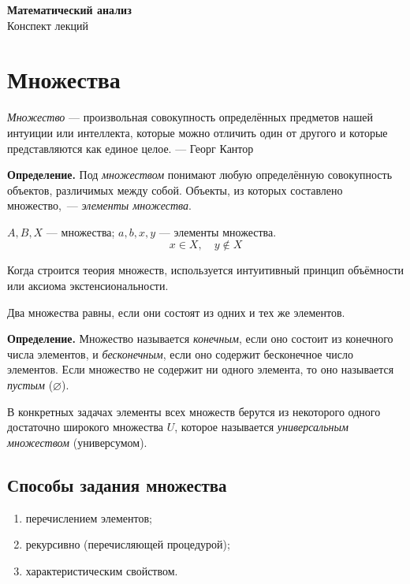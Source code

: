\documentclass[a4paper,11pt]{article}
\begin{document}
\begin{center}
{\LARGE\bfseries\color{secred}Математический анализ}\\[3pt]
{\large Конспект лекций}
\end{center}
\vspace{-2mm}

\tableofcontents
\newpage

\section{Множества}

\emph{Множество} --- произвольная совокупность определённых предметов нашей
интуиции или интеллекта, которые можно отличить один от другого и которые
представляются как единое целое.
\hfill --- Георг Кантор

\begin{opr}
\textbf{Определение.} Под \emph{множеством} понимают любую определённую совокупность объектов,
различимых между собой. Объекты, из которых составлено множество,~---
\emph{элементы множества}.
\end{opr}

$A, B, X$ --- множества; \quad $a, b, x, y$ --- элементы множества.
\[
  \boxed{x \in X, \quad y \notin X}
\]

Когда строится теория множеств, используется интуитивный принцип объёмности
или аксиома экстенсиональности.

Два множества равны, если они состоят из одних и тех же элементов.

\begin{opr}
\textbf{Определение.} Множество называется \emph{конечным}, если оно состоит из конечного числа
элементов, и \emph{бесконечным}, если оно содержит бесконечное число элементов.
Если множество не содержит ни одного элемента, то оно называется \emph{пустым} ($\varnothing$).
\end{opr}

В конкретных задачах элементы всех множеств берутся из некоторого одного
достаточно широкого множества $U$, которое называется
\emph{универсальным множеством} (универсумом).

\subsection{Способы задания множества}

\begin{enumerate}
  \item перечислением элементов;
  \item рекурсивно (перечисляющей процедурой);
  \item характеристическим свойством.
\end{enumerate}
\end{document}
